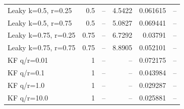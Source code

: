 \begin{tabular}{lrrrrc}
Leaky k=0.5, r=0.25 & 0.5 & -- & 4.5422 & 0.061615 & -- \\
Leaky k=0.5, r=0.75 & 0.5 & -- & 5.0827 & 0.069441 & -- \\
Leaky k=0.75, r=0.25 & 0.75 & -- & 6.7292 & 0.03791 & -- \\
Leaky k=0.75, r=0.75 & 0.75 & -- & 8.8905 & 0.052101 & -- \\
KF q/r=0.01 & 1 & -- & -- & 0.072175 & -- \\
KF q/r=0.1 & 1 & -- & -- & 0.043984 & -- \\
KF q/r=1.0 & 1 & -- & -- & 0.029287 & -- \\
KF q/r=10.0 & 1 & -- & -- & 0.025881 & -- \\
\bottomrule\end{tabular}

